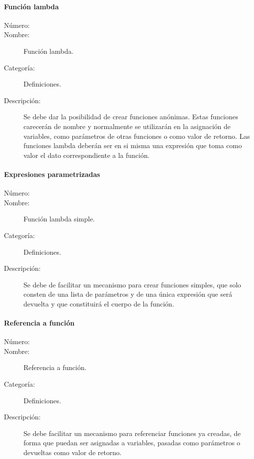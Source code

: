 \paragraph{Función lambda}
\begin{framed}
	\begin{description}
		\item [Número:] \cn
		\item [Nombre:] Función lambda.
		\item [Categoría:] Definiciones.
		\item [Descripción:] Se debe dar la posibilidad de crear funciones anónimas. Estas funciones carecerán de nombre y 
		normalmente se utilizarán en la asignación de variables, como parámetros de otras funciones o como valor de retorno. 
		Las funciones lambda deberán ser en si misma una expresión que toma como valor el dato correspondiente a la función. 
	\end{description}
\end{framed}

\paragraph{Expresiones parametrizadas}
\begin{framed}
	\begin{description}
		\item [Número:] \cn
		\item [Nombre:] Función lambda simple.
		\item [Categoría:] Definiciones.
		\item [Descripción:] Se debe de facilitar un mecanismo para crear funciones simples, que solo consten de una lista de parámetros
		y de una única expresión que será devuelta y que constituirá el cuerpo de la función. 
	\end{description}
\end{framed}

\paragraph{Referencia a función}
\begin{framed}
	\begin{description}
		\item [Número:] \cn
		\item [Nombre:] Referencia a función.
		\item [Categoría:] Definiciones.
		\item [Descripción:] Se debe facilitar un mecanismo para referenciar funciones ya creadas, de forma que puedan ser asignadas a variables, 
		pasadas como parámetros o devueltas como valor de retorno. 
	\end{description}
\end{framed}

